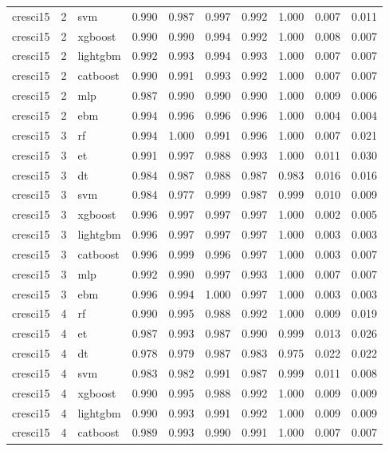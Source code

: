 \begin{tabular}{lrlrrrrrrr}
cresci15 & 2 & svm & 0.990 & 0.987 & 0.997 & 0.992 & 1.000 & 0.007 & 0.011 \\
cresci15 & 2 & xgboost & 0.990 & 0.990 & 0.994 & 0.992 & 1.000 & 0.008 & 0.007 \\
cresci15 & 2 & lightgbm & 0.992 & 0.993 & 0.994 & 0.993 & 1.000 & 0.007 & 0.007 \\
cresci15 & 2 & catboost & 0.990 & 0.991 & 0.993 & 0.992 & 1.000 & 0.007 & 0.007 \\
cresci15 & 2 & mlp & 0.987 & 0.990 & 0.990 & 0.990 & 1.000 & 0.009 & 0.006 \\
cresci15 & 2 & ebm & 0.994 & 0.996 & 0.996 & 0.996 & 1.000 & 0.004 & 0.004 \\
cresci15 & 3 & rf & 0.994 & 1.000 & 0.991 & 0.996 & 1.000 & 0.007 & 0.021 \\
cresci15 & 3 & et & 0.991 & 0.997 & 0.988 & 0.993 & 1.000 & 0.011 & 0.030 \\
cresci15 & 3 & dt & 0.984 & 0.987 & 0.988 & 0.987 & 0.983 & 0.016 & 0.016 \\
cresci15 & 3 & svm & 0.984 & 0.977 & 0.999 & 0.987 & 0.999 & 0.010 & 0.009 \\
cresci15 & 3 & xgboost & 0.996 & 0.997 & 0.997 & 0.997 & 1.000 & 0.002 & 0.005 \\
cresci15 & 3 & lightgbm & 0.996 & 0.997 & 0.997 & 0.997 & 1.000 & 0.003 & 0.003 \\
cresci15 & 3 & catboost & 0.996 & 0.999 & 0.996 & 0.997 & 1.000 & 0.003 & 0.007 \\
cresci15 & 3 & mlp & 0.992 & 0.990 & 0.997 & 0.993 & 1.000 & 0.007 & 0.007 \\
cresci15 & 3 & ebm & 0.996 & 0.994 & 1.000 & 0.997 & 1.000 & 0.003 & 0.003 \\
cresci15 & 4 & rf & 0.990 & 0.995 & 0.988 & 0.992 & 1.000 & 0.009 & 0.019 \\
cresci15 & 4 & et & 0.987 & 0.993 & 0.987 & 0.990 & 0.999 & 0.013 & 0.026 \\
cresci15 & 4 & dt & 0.978 & 0.979 & 0.987 & 0.983 & 0.975 & 0.022 & 0.022 \\
cresci15 & 4 & svm & 0.983 & 0.982 & 0.991 & 0.987 & 0.999 & 0.011 & 0.008 \\
cresci15 & 4 & xgboost & 0.990 & 0.995 & 0.988 & 0.992 & 1.000 & 0.009 & 0.009 \\
cresci15 & 4 & lightgbm & 0.990 & 0.993 & 0.991 & 0.992 & 1.000 & 0.009 & 0.009 \\
cresci15 & 4 & catboost & 0.989 & 0.993 & 0.990 & 0.991 & 1.000 & 0.007 & 0.007 \\

\end{tabular}
